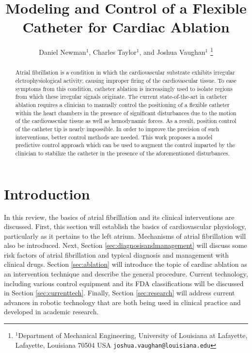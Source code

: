\documentclass[letterpaper,10pt,conference]{ieeeconf}   %
\begin{document}
\title{\LARGE \bf Modeling and Control of a Flexible Catheter for Cardiac Ablation}

\author{Daniel Newman$^{1}$, Charles Taylor$^{1}$, and Joshua Vaughan$^{1}$%
\thanks{$^{1}$Department of Mechanical Engineering,
        University of Louisiana at Lafayette, Lafayette, Louisiana 70504 USA
        {\tt\small joshua.vaughan@louisiana.edu}}%
}

    
\maketitle

\begin{abstract}
Atrial fibrillation is a condition in which the cardiovascular substrate exhibits irregular elctrophysiological activity, causing improper firing of the cardiovascular tissue. To ease symptoms from this condition, catheter ablation is increasingly used to isolate regions from which these irregular signals originate. The current state-of-the-art in catheter ablation requires a clinician to manually control the positioning of a flexible catheter within the heart chambers in the presence of significant disturbances due to the motion of the cardiovascular tissue as well as hemodynamic forces. As a result, position control of the catheter tip is nearly impossible. In order to improve the precision of such interventions, better control methods are needed. This work proposes a model predictive control approach which can be used to augment the control imparted by the clinician to stabilize the catheter in the presence of the aforementioned disturbances. 
\end{abstract}


\section{Introduction}
\label{sec:intro}

In this review, the basics of atrial fibrillation and its clinical interventions are discussed. First, this section will establish the basics of cardiovascular physiology, particularly as it pertains to the left atrium. Mechanisms of atrial fibrillation will also be introduced. Next, Section \ref{sec:diagnosisandmanagement} will discuss some risk factors of atrial fibrillation and typical diagnosis and management with clinical drugs. Section \ref{sec:ablation} will introduce the topic of cardiac ablation as an intervention technique and describe the general procedure. Current technology, including various control equipment and its FDA classifications will be discussed in Section \ref{sec:currenttech}. Finally, Section \ref{sec:research} will address current advances in robotic technology that are both being used in clinical practice and developed in academic research.
\end{document}

